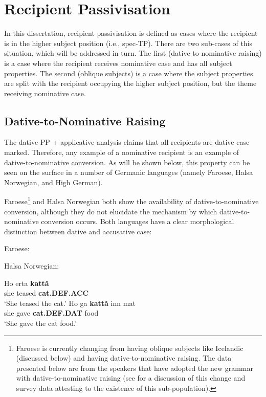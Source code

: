 \section{Recipient Passivisation}
In this dissertation, recipient passivisation is defined as cases where the recipient is in the higher subject position (i.e., spec-TP). There are two sub-cases of this situation, which will be addressed in turn. The first (dative-to-nominative raising) is a case where the recipient receives nominative case and has all subject properties. The second (oblique subjects) is a case where the subject properties are split with the recipient occupying the higher subject position, but the theme receiving nominative case.

\subsection{Dative-to-Nominative Raising}

The dative PP + applicative analysis claims that all recipients are dative case marked. Therefore, any example of a nominative recipient is an example of dative-to-nominative conversion. As will be shown below, this property can be seen on the surface in a number of Germanic languages (namely Faroese, Halsa Norwegian, and High German). 

Faroese\footnote{Faroese is currently changing from having oblique subjects like Icelandic (discussed below) and having dative-to-nominative raising. The data presented below are from the speakers that have adopted the new grammar with dative-to-nominative raising (see \cite{Eyorsson.2012} for a discussion of this change and survey data attesting to the existence of this sub-population).} and Halsa Norwegian both show the availability of dative-to-nominative conversion, although they do not elucidate the mechanism by which dative-to-nominative conversion occurs. Both languages have a clear morphological distinction between dative and accusative case:

\begin{exe}
	\ex Faroese:\label{ex:far-case}
		\begin{xlist}
		\end{xlist}
		\ex Halsa Norwegian:\label{ex:halsa-case}
	\begin{xlist}
		\ex \gll Ho erta \textbf{katt\aa} \\
		she teased \textbf{cat.DEF.ACC} \\
			\trans `She teased the cat.'
			\ex \gll Ho ga \textbf{katt\aa} inn mat \\
			she gave \textbf{cat.DEF.DAT} food \\
			\trans `She gave the cat food.'
	\end{xlist}
\end{exe}

